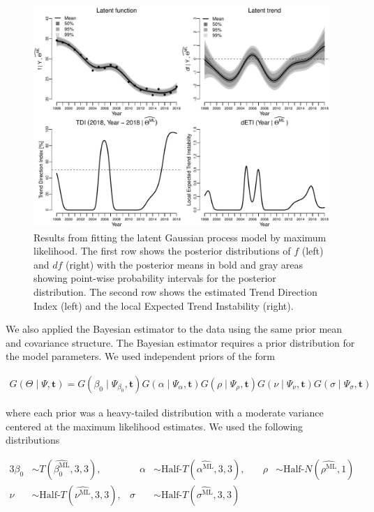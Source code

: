 \documentclass[11pt,]{article}
\theoremstyle{nonumberplain}
\begin{document}
\begin{figure}[htb]
\center\includegraphics{likFitPlot}
\caption{Results from fitting the latent Gaussian process model by maximum likelihood. The first row shows the posterior distributions of $f$ (left) and $df$ (right) with the posterior means in bold and gray areas showing point-wise probability intervals for the posterior distribution. The second row shows the estimated Trend Direction Index (left) and the local Expected Trend Instability (right).}
\label{fig:likFitPlot}
\end{figure}

We also applied the Bayesian estimator to the data using the same prior
mean and covariance structure. The Bayesian estimator requires a prior
distribution for the model parameters. We used independent priors of the
form

\begin{align*}
G(\Theta \mid \Psi, \mathbf{t}) = G(\beta_0 \mid \Psi_{\beta_0}, \mathbf{t})G(\alpha \mid \Psi_{\alpha}, \mathbf{t})G(\rho \mid \Psi_{\rho}, \mathbf{t})G(\nu \mid \Psi_{\nu}, \mathbf{t})G(\sigma \mid \Psi_{\sigma}, \mathbf{t})
\end{align*}

where each prior was a heavy-tailed distribution with a moderate
variance centered at the maximum likelihood estimates. We used the
following distributions

\begin{alignat*}{3}
 \beta_0 &\sim T\left(\widehat{\beta_0^\text{ML}}, 3, 3\right), &\quad \alpha &\sim \text{Half-}T\left(\widehat{\alpha^\text{ML}}, 3, 3\right), &\quad \rho &\sim \text{Half-}N\left(\widehat{\rho^\text{ML}}, 1\right)\\   
 \nu &\sim \text{Half-}T\left(\widehat{\nu^\text{ML}}, 3, 3\right), & \sigma &\sim \text{Half-}T\left(\widehat{\sigma^\text{ML}}, 3, 3\right)  & 
\end{alignat*}
\end{document}
